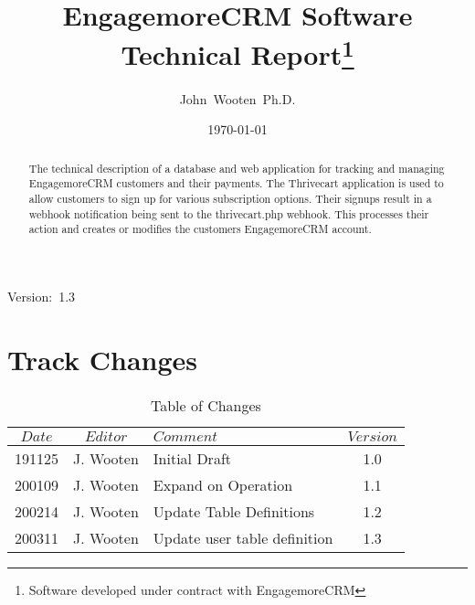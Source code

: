 \documentclass[final,letterpaper,12pt]{article}
\author{John~Wooten~Ph.D.\\
}
\date{\today \\
}
\title{EngagemoreCRM Software Technical Report\thanks{Software developed under contract with EngagemoreCRM}}
\begin{document}
\maketitle
\begin{center}
Version:~1.3
\end{center}

\begin {abstract}
\noindent The technical description of a database and web application
for tracking and managing EngagemoreCRM customers and their payments.
The Thrivecart application is used to allow customers to sign up for various
subscription options.  Their signups result in a webhook notification being sent to
the thrivecart.php webhook.  This processes their action and creates or modifies
the customers EngagemoreCRM account.
\end{abstract}
\newpage
\tableofcontents
\newpage
\listoffigures
\listoftables

\newpage
\section{Track Changes}
\begin{table}[h]
\begin{center}
\begin{tabular}{|c|c|l|c|} \hline
$ Date $ & $Editor$ & $Comment$ & $Version$ \\
\hline
191125 & J. Wooten & Initial Draft & 1.0  \\
200109 & J. Wooten & Expand on Operation & 1.1 \\
200214 & J. Wooten & Update Table Definitions & 1.2 \\
200311 & J. Wooten & Update user table definition & 1.3 \\

\hline
\end{tabular}
\end{center}
\caption {Table of Changes}
\label{tab:cqdata0}
\end{table}

\newpage
\end{document}
